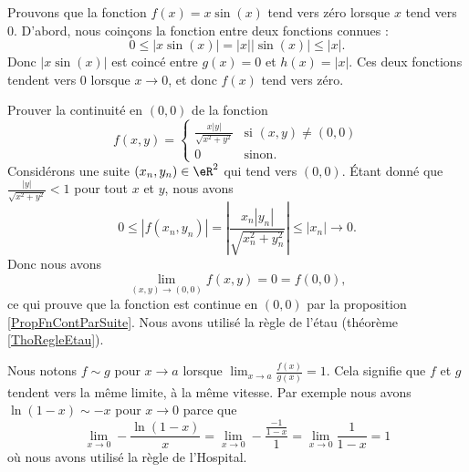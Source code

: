 \begin{example}
	Prouvons que la fonction $f(x)=x\sin(x)$ tend vers zéro lorsque $x$ tend vers $0$. D'abord, nous coinçons la fonction entre deux fonctions connues :
	\begin{equation}
		0\leq| x\sin(x) |=| x | |\sin(x) |\leq | x |.
	\end{equation}
	Donc $| x\sin(x) |$ est coincé entre $g(x)=0$ et $h(x)=| x |$. Ces deux fonctions tendent vers $0$ lorsque $x\to 0$, et donc $f(x)$ tend vers zéro.
\end{example}


\begin{example}
	Prouver la continuité en $(0,0)$ de la fonction
	\begin{equation}
		f(x,y)=\begin{cases}
			\frac{ x | y | }{ \sqrt{x^2+y^2} }	&	\text{si $(x,y)\neq (0,0)$}\\
			0	&	 \text{sinon.}
		\end{cases}
	\end{equation}
	Considérons une suite $(x_n,y_n)\in\eR^2$ qui tend vers $(0,0)$. Étant donné que $\frac{ | y | }{ \sqrt{x^2+y^2} }<1$ pour tout $x$ et $y$, nous avons
	\begin{equation}
		0\leq | f(x_n,y_n) |=\left| \frac{ x_n | y_n | }{ \sqrt{x_n^2+y_n^2} } \right| \leq | x_n |\to 0.
	\end{equation}
	Donc nous avons
	\begin{equation}
		\lim_{(x,y)\to(0,0)}f(x,y)=0=f(0,0),
	\end{equation}
	ce qui prouve que la fonction est continue en $(0,0)$ par la proposition \ref{PropFnContParSuite}. Nous avons utilisé la règle de l'étau (théorème \ref{ThoRegleEtau}).
\end{example}

Nous notons \( f\sim g\) pour \( x\to a\) lorsque \( \lim_{x\to a} \frac{ f(x) }{ g(x) }=1\). Cela signifie que \( f\) et \( g\) tendent vers la même limite, à la même vitesse. Par exemple nous avons \( \ln(1-x)\sim -x\) pour \( x\to 0\) parce que
\begin{equation}    \label{EqGICpOX}
    \lim_{x\to 0} -\frac{ \ln(1-x) }{ x }=\lim_{x\to 0} -\frac{ \frac{ -1 }{ 1-x } }{ 1 }=\lim_{x\to 0} \frac{1}{ 1-x }=1
\end{equation}
où nous avons utilisé la règle de l'Hospital.

